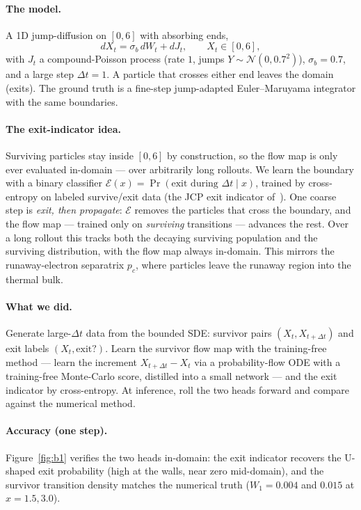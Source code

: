 \documentclass[11pt]{article}
\begin{document}
\paragraph{The model.} A 1D jump-diffusion on $[0,6]$ with absorbing ends,
\begin{equation}
dX_t = \sigma_b\,dW_t + dJ_t, \qquad X_t \in [0,6],
\end{equation}
with $J_t$ a compound-Poisson process (rate $1$, jumps $Y\sim\mathcal N(0,0.7^2)$),
$\sigma_b=0.7$, and a large step $\Delta t=1$. A particle that crosses either end
leaves the domain (exits). The ground truth is a fine-step jump-adapted
Euler--Maruyama integrator with the same boundaries.

\paragraph{The exit-indicator idea.} Surviving particles stay inside $[0,6]$ by
construction, so the flow map is only ever evaluated in-domain --- over
arbitrarily long rollouts. We learn the boundary with a binary classifier
$\mathcal E(x)=\Pr(\text{exit during }\Delta t \mid x)$, trained by cross-entropy
on labeled survive/exit data (the JCP exit indicator of~\cite{yang2025}). One
coarse step is \emph{exit, then propagate}: $\mathcal E$ removes the particles
that cross the boundary, and the flow map --- trained only on \emph{surviving}
transitions --- advances the rest. Over a long rollout this tracks both the
decaying surviving population and the surviving distribution, with the flow map
always in-domain. This mirrors the runaway-electron separatrix $p_c$, where
particles leave the runaway region into the thermal bulk.

\paragraph{What we did.} Generate large-$\Delta t$ data from the bounded SDE:
survivor pairs $(X_t,X_{t+\Delta t})$ and exit labels $(X_t,\text{exit?})$. Learn
the survivor flow map with the training-free method --- learn the increment
$X_{t+\Delta t}-X_t$ via a probability-flow ODE with a training-free Monte-Carlo
score, distilled into a small network --- and the exit indicator by cross-entropy.
At inference, roll the two heads forward and compare against the numerical method.

\paragraph{Accuracy (one step).} Figure~\ref{fig:b1} verifies the two heads
in-domain: the exit indicator recovers the U-shaped exit probability (high at the
walls, near zero mid-domain), and the survivor transition density matches the
numerical truth ($W_1=0.004$ and $0.015$ at $x=1.5,3.0$).
\end{document}

